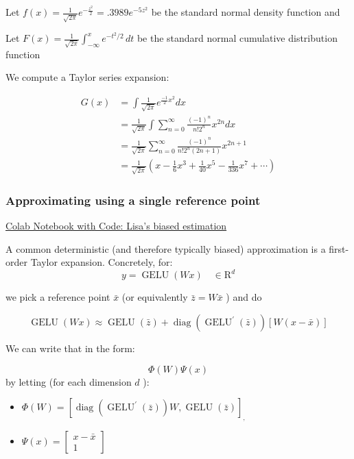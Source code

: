 \documentclass{article}
\begin{document}
Let
$f(x)= \frac{1}{{\sqrt {2\pi } }}e^{ - \frac{{z^2 }}{2}} = .3989e^{ - 5z^2 }$ be the standard normal density function and 

Let
$F(x)={\frac{1}{\sqrt{2\pi}}}\int_{-\infty }^{x}e^{-t^{2}/2}\,dt $
be the standard normal cumulative distribution function

We compute a Taylor series expansion:

\begin{equation}
\begin{aligned}
G(x) & =\int \frac{1}{\sqrt{2 \pi}} e^{\frac{-1}{2} x^2} d x \\
& =\frac{1}{\sqrt{2 \pi}} \int \sum_{n=0}^{\infty} \frac{(-1)^n}{n!2^n} x^{2 n} d x \\
& =\frac{1}{\sqrt{2 \pi}} \sum_{n=0}^{\infty} \frac{(-1)^n}{n!2^n(2 n+1)} x^{2 n+1} \\
& =\frac{1}{\sqrt{2 \pi}}\left(x-\frac{1}{6} x^3+\frac{1}{40} x^5-\frac{1}{336} x^7+\cdots\right)
\end{aligned}
\end{equation}



\subsubsection{Approximating using a single reference point}
\href{https://github.com/lisahqwang/ML-DL-CV/blob/main/Lisa_Biased_Estimation.ipynb}{
Colab Notebook with Code: Lisa's biased estimation}

A common deterministic (and therefore typically biased) approximation is a first-order Taylor expansion. Concretely, for:
$$
y=\operatorname{GELU}(W x) \quad \in \mathrm{R}^d
$$

we pick a reference point $\bar{x}$ (or equivalently $\bar{z}=W \bar{x}$ ) and do


$$
\operatorname{GELU}(W x) \approx \operatorname{GELU}(\bar{z})+\operatorname{diag}\left(\operatorname{GELU}^{\prime}(\bar{z})\right)[W(x-\bar{x})]
$$


We can write that in the form:


$$
\Phi(W) \Psi(x)
$$
by letting (for each dimension $d$ ):

\begin{itemize}
  \item $\Phi(W)=\left[\operatorname{diag}\left(\operatorname{GELU}^{\prime}(\bar{z})\right) W, \operatorname{GELU}(\bar{z})\right]_{\text {, }}$
  \item $\Psi(x)=\left[\begin{array}{c}x-\bar{x} \\ 1\end{array}\right]$
\end{itemize}
\end{document}
